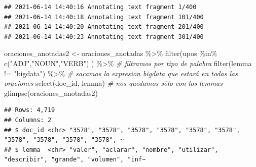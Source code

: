 \documentclass[
]{book}
\newenvironment{Shaded}{\begin{snugshade}}{\end{snugshade}}
\newcommand{\AttributeTok}[1]{\textcolor[rgb]{0.77,0.63,0.00}{#1}}
\newcommand{\CommentTok}[1]{\textcolor[rgb]{0.56,0.35,0.01}{\textit{#1}}}
\newcommand{\DecValTok}[1]{\textcolor[rgb]{0.00,0.00,0.81}{#1}}
\newcommand{\FunctionTok}[1]{\textcolor[rgb]{0.00,0.00,0.00}{#1}}
\newcommand{\NormalTok}[1]{#1}
\newcommand{\OtherTok}[1]{\textcolor[rgb]{0.56,0.35,0.01}{#1}}
\newcommand{\SpecialCharTok}[1]{\textcolor[rgb]{0.00,0.00,0.00}{#1}}
\newcommand{\StringTok}[1]{\textcolor[rgb]{0.31,0.60,0.02}{#1}}
\begin{document}
\begin{Shaded}
\end{Shaded}

\begin{verbatim}
## 2021-06-14 14:40:16 Annotating text fragment 1/400
## 2021-06-14 14:40:18 Annotating text fragment 101/400
## 2021-06-14 14:40:20 Annotating text fragment 201/400
## 2021-06-14 14:40:23 Annotating text fragment 301/400
\end{verbatim}

\begin{Shaded}
\begin{Highlighting}[]
\NormalTok{oraciones\_anotadas2 }\OtherTok{\textless{}{-}}\NormalTok{ oraciones\_anotadas }\SpecialCharTok{\%\textgreater{}\%} 
  \FunctionTok{filter}\NormalTok{(upos }\SpecialCharTok{\%in\%} \FunctionTok{c}\NormalTok{(}\StringTok{"ADJ"}\NormalTok{,}\StringTok{"NOUN"}\NormalTok{,}\StringTok{"VERB"}\NormalTok{) ) }\SpecialCharTok{\%\textgreater{}\%} \CommentTok{\# filtramos por tipo de palabra}
  \FunctionTok{filter}\NormalTok{(lemma }\SpecialCharTok{!=} \StringTok{"bigdata"}\NormalTok{) }\SpecialCharTok{\%\textgreater{}\%} \CommentTok{\# sacamos la expresion bigdata que estará en todas las oraciones}
  \FunctionTok{select}\NormalTok{(doc\_id, lemma) }\CommentTok{\# nos quedamos sólo con los lemmas}
\FunctionTok{glimpse}\NormalTok{(oraciones\_anotadas2)}
\end{Highlighting}
\end{Shaded}

\begin{verbatim}
## Rows: 4,719
## Columns: 2
## $ doc_id <chr> "3578", "3578", "3578", "3578", "3578", "3578", "3578", "3578", "3578", "3578", ~
## $ lemma  <chr> "valer", "aclarar", "nombre", "utilizar", "describir", "grande", "volumen", "inf~
\end{verbatim}
\end{document}
